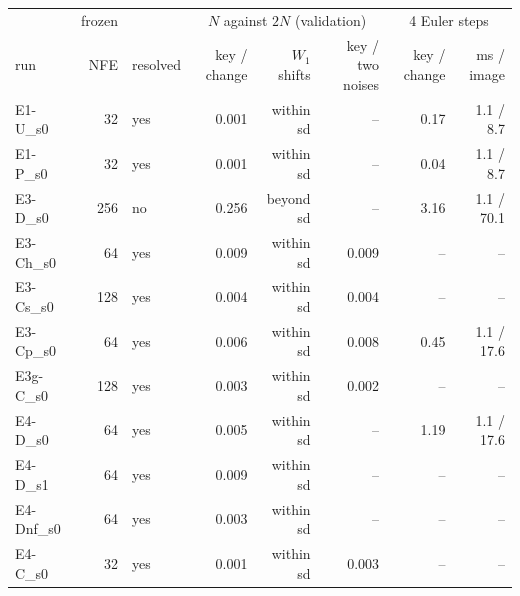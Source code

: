\scriptsize
\setlength{\tabcolsep}{3pt}
\begin{tabular}{lrlrrrrr}
\toprule
 & frozen & & \multicolumn{3}{c}{$N$ against $2N$ (validation)} & \multicolumn{2}{c}{4 Euler steps} \\
run & NFE & resolved & key / change & $W_1$ shifts & key / two noises & key / change & ms / image \\
\midrule
E1-U\_s0 & 32 & yes & 0.001 & within sd & -- & 0.17 & 1.1 / 8.7 \\
E1-P\_s0 & 32 & yes & 0.001 & within sd & -- & 0.04 & 1.1 / 8.7 \\
E3-D\_s0 & 256 & no & 0.256 & beyond sd & -- & 3.16 & 1.1 / 70.1 \\
E3-Ch\_s0 & 64 & yes & 0.009 & within sd & 0.009 & -- & -- \\
E3-Cs\_s0 & 128 & yes & 0.004 & within sd & 0.004 & -- & -- \\
E3-Cp\_s0 & 64 & yes & 0.006 & within sd & 0.008 & 0.45 & 1.1 / 17.6 \\
E3g-C\_s0 & 128 & yes & 0.003 & within sd & 0.002 & -- & -- \\
E4-D\_s0 & 64 & yes & 0.005 & within sd & -- & 1.19 & 1.1 / 17.6 \\
E4-D\_s1 & 64 & yes & 0.009 & within sd & -- & -- & -- \\
E4-Dnf\_s0 & 64 & yes & 0.003 & within sd & -- & -- & -- \\
E4-C\_s0 & 32 & yes & 0.001 & within sd & 0.003 & -- & -- \\
\bottomrule
\end{tabular}
